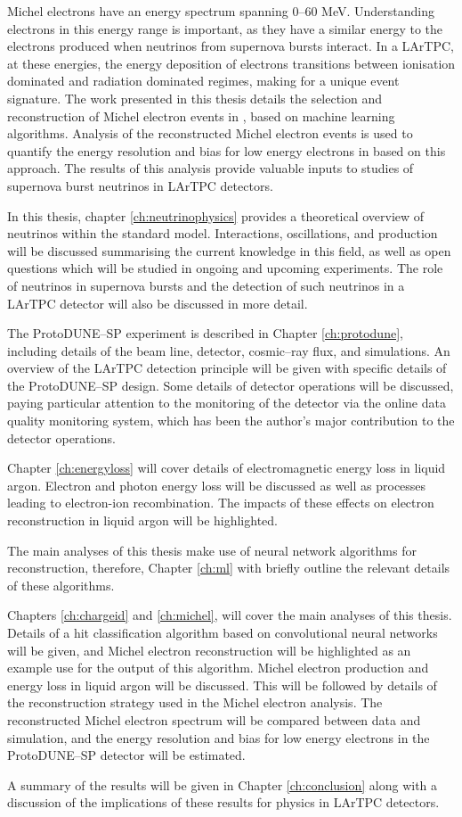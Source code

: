 Michel electrons have an energy spectrum spanning 0--60 MeV. Understanding
electrons in this energy range is important, as they have a similar energy to 
the electrons produced when neutrinos from supernova bursts interact. In a 
LArTPC, at these energies, the energy deposition of electrons transitions 
between ionisation dominated and radiation dominated regimes, making for a 
unique event signature. The work presented in this thesis details the 
selection and reconstruction of Michel electron events in \protodune{}, based 
on machine learning algorithms. Analysis of the reconstructed Michel electron 
events is used to quantify the energy resolution and bias for low energy 
electrons in \protodune{} based on this approach. The results of this analysis 
provide valuable inputs to studies of supernova burst neutrinos in LArTPC 
detectors.

In this thesis, chapter \ref{ch:neutrinophysics} provides a theoretical 
overview of neutrinos within the standard model. Interactions, oscillations, 
and production will be discussed summarising the current knowledge in this
field, as well as open questions which will be studied in ongoing and upcoming 
experiments. The role of neutrinos in supernova bursts and the detection of 
such neutrinos in a LArTPC detector will also be discussed in more detail.

The ProtoDUNE--SP experiment is described in Chapter \ref{ch:protodune},
including details of the beam line, detector, cosmic--ray flux, and simulations.
An overview of the LArTPC detection principle will be given with specific
details of the ProtoDUNE--SP design. Some details of detector operations will be
discussed, paying particular attention to the monitoring of the detector via the
online data quality monitoring system, which has been the author's major 
contribution to the detector operations.

Chapter \ref{ch:energyloss} will cover details of electromagnetic energy loss
in liquid argon. Electron and photon energy loss will be discussed as well as
processes leading to electron-ion recombination. The impacts of these effects on
electron reconstruction in liquid argon will be highlighted.

The main analyses of this thesis make use of neural network algorithms for 
reconstruction, therefore, Chapter \ref{ch:ml} with briefly outline the 
relevant details of these algorithms.

Chapters \ref{ch:chargeid} and \ref{ch:michel}, will cover the main analyses 
of this thesis. Details of a hit classification algorithm based on 
convolutional neural networks will be given, and Michel electron 
reconstruction will be highlighted as an example use for the output of this 
algorithm. Michel electron production and energy loss in liquid argon will be 
discussed. This will be followed by details of the reconstruction strategy 
used in the Michel electron analysis. The reconstructed Michel electron 
spectrum will be compared between data and simulation, and the energy 
resolution and bias for low energy electrons in the ProtoDUNE--SP detector 
will be estimated. 

A summary of the results will be given in Chapter \ref{ch:conclusion} along 
with a discussion of the implications of these results for physics in LArTPC 
detectors.
